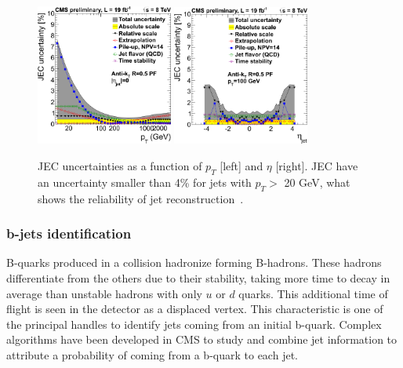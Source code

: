 \begin{figure}[!Hhtbp]
  \begin{center}
    \includegraphics[width=0.4\textwidth]{figs/JEC_pt.png}
    \includegraphics[width=0.4\textwidth]{figs/JEC_eta.png}
    \caption{JEC uncertainties as a function of $p_{T}$ [left] and $\eta$ [right]. JEC have an uncertainty smaller than 4\% for jets with $p_{T}>$ 20 GeV, what shows the reliability of jet reconstruction~\cite{Brochet:1956723}.}
    \label{fig:JEC}
  \end{center}
\end{figure}

\subsubsection{b-jets identification}
\label{sec:bid}

B-quarks produced in a collision hadronize forming B-hadrons. These hadrons differentiate from the others due to their stability, taking more time to decay in average than unstable hadrons with only $u$ or $d$ quarks. This additional time of flight is seen in the detector as a displaced vertex. This characteristic is one of the principal handles to identify jets coming from an initial b-quark. Complex algorithms have been developed in CMS to study and combine jet information to attribute a probability of coming from a b-quark to each jet.  

